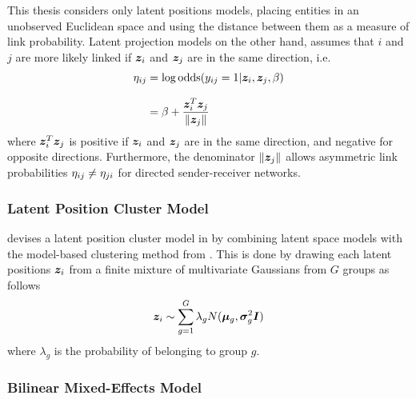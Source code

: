         This thesis considers only latent positions models, placing entities in an unobserved Euclidean space and using the distance between them as a measure of link probability. Latent projection models on the other hand, assumes that $i$ and $j$ are more likely linked if $\bm{z}_i$ and $\bm{z}_j$ are in the same direction, i.e.
        \begin{equation}
            \begin{split}
                \sub(\eta) &= \log \odds(\sub(y)=1|\z_i,\z_j,\beta) \\[0.5\baselineskip]
                &= \beta + \frac{\z_i^T\z_j}{\Vert\z_j\Vert}
            \end{split}
        \end{equation}
        where $\bm{z}_i^T\bm{z}_j$ is positive if $\bm{z}_i$ and $\bm{z}_j$ are in the same direction, and negative for opposite directions. Furthermore, the denominator $\Vert\bm{z}_j\Vert$ allows asymmetric link probabilities $\sub(\eta)\neq\sub(\eta)(ji)$ for directed sender-receiver networks.
        
    \subsubsection{Latent Position Cluster Model}
    
        \citeauthor*{handcock2015clustering} devises a latent position cluster model in \cite{handcock2015clustering} by combining latent space models with the model-based clustering method from \cite{banfield1993gaussian}. This is done by drawing each latent positions $\bm{z}_i$ from a finite mixture of multivariate Gaussians from $G$ groups as follows
        \begin{equation}
            \bm{z}_i\sim\sum_{g=1}^G\lambda_g N(\bm{\mu}_g,\bm{\sigma}_g^2\bm{I})
        \end{equation}
        where $\lambda_g$ is the probability of belonging to group $g$.
        
    \subsubsection{Bilinear Mixed-Effects Model}
    
